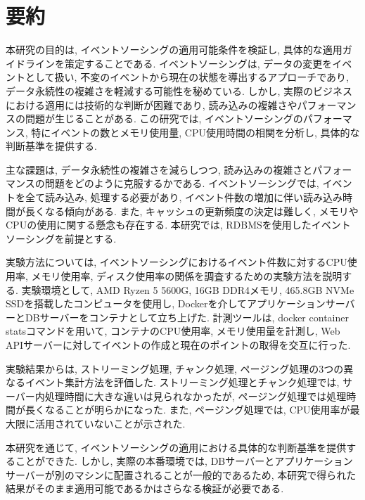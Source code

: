 \documentclass[../../main]{subfiles}
\begin{document}
    \section{要約}\label{sec:phraseology}

    本研究の目的は, イベントソーシングの適用可能条件を検証し, 具体的な適用ガイドラインを策定することである. イベントソーシングは, データの変更をイベントとして扱い, 不変のイベントから現在の状態を導出するアプローチであり, データ永続性の複雑さを軽減する可能性を秘めている. しかし, 実際のビジネスにおける適用には技術的な判断が困難であり, 読み込みの複雑さやパフォーマンスの問題が生じることがある. この研究では, イベントソーシングのパフォーマンス, 特にイベントの数とメモリ使用量, CPU使用時間の相関を分析し, 具体的な判断基準を提供する.

    主な課題は, データ永続性の複雑さを減らしつつ, 読み込みの複雑さとパフォーマンスの問題をどのように克服するかである. イベントソーシングでは, イベントを全て読み込み, 処理する必要があり, イベント件数の増加に伴い読み込み時間が長くなる傾向がある. また, キャッシュの更新頻度の決定は難しく, メモリやCPUの使用に関する懸念も存在する. 本研究では, RDBMSを使用したイベントソーシングを前提とする.

    実験方法については, イベントソーシングにおけるイベント件数に対するCPU使用率, メモリ使用率, ディスク使用率の関係を調査するための実験方法を説明する. 実験環境として, AMD Ryzen 5 5600G, 16GB DDR4メモリ, 465.8GB NVMe SSDを搭載したコンピュータを使用し, Dockerを介してアプリケーションサーバーとDBサーバーをコンテナとして立ち上げた. 計測ツールは, docker container statsコマンドを用いて, コンテナのCPU使用率, メモリ使用量を計測し, Web APIサーバーに対してイベントの作成と現在のポイントの取得を交互に行った.

    実験結果からは, ストリーミング処理, チャンク処理, ページング処理の3つの異なるイベント集計方法を評価した. ストリーミング処理とチャンク処理では, サーバー内処理時間に大きな違いは見られなかったが, ページング処理では処理時間が長くなることが明らかになった. また, ページング処理では, CPU使用率が最大限に活用されていないことが示された.

    本研究を通じて, イベントソーシングの適用における具体的な判断基準を提供することができた. しかし, 実際の本番環境では, DBサーバーとアプリケーションサーバーが別のマシンに配置されることが一般的であるため, 本研究で得られた結果がそのまま適用可能であるかはさらなる検証が必要である.

    \clearpage
\end{document}
